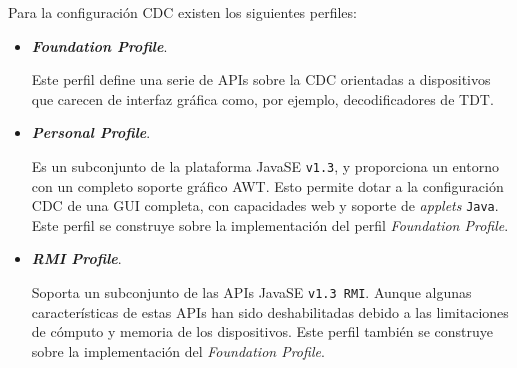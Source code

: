 Para la configuración \acs{CDC} existen los siguientes perfiles:
\begin{itemize}
\item \textbf{\emph{Foundation Profile}}. 

Este perfil define una serie de \acs{API}s sobre la \acs{CDC} orientadas a
dispositivos que carecen de interfaz gráfica como, por ejemplo, decodificadores 
de \acs{TDT}.

\item \textbf{\emph{Personal Profile}}.

Es un subconjunto de la plataforma \acs{JavaSE} \texttt{v1.3}, y proporciona un 
entorno con un completo soporte gráfico \acs{AWT}. Esto permite dotar a la
configuración \acs{CDC} de una \acs{GUI} completa, con capacidades web y
soporte de \emph{applets} \texttt{Java}. Este perfil se construye sobre
la implementación del perfil \emph{Foundation Profile}.

\item \textbf{\emph{RMI Profile}}.

Soporta un subconjunto de las \acs{API}s \acs{JavaSE} \texttt{v1.3 RMI}.
Aunque algunas características de estas \acs{API}s han sido deshabilitadas
debido a las limitaciones de cómputo y memoria de los dispositivos. Este
perfil también se construye sobre la implementación del \emph{Foundation 
Profile}.

\end{itemize}

